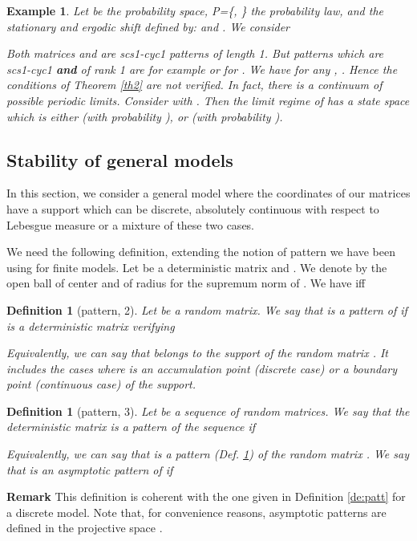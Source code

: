 \documentclass[11pt,titlepage]{article}
\newcommand{\parag}{\medskip\noindent}
\newtheorem{defi}[theo]{Definition }
\newtheorem{example}[theo]{Example }
\newenvironment{exam}{\begin{example}\rm}{\end{example}}
\begin{document}
\begin{exam}
\label{ex:erg1}
Let  be the probability space,
P=\{, \} the 
probability law, and  the stationary and ergodic shift defined by:
 and .
We consider


Both matrices  and  are scs1-cyc1 patterns of length 1. But
patterns which are scs1-cyc1 {\bf and} of rank 1 are for example  or  for
. We have for any , . Hence the conditions of Theorem \ref{th2}
are not verified. In fact, there is a continuum of
possible periodic limits. Consider  with
. Then the limit regime of  has a
state space which is either 
 (with probability ), or  (with probability ).
\end{exam}

\subsection{Stability of general models}
\label{sse:sgm}
In this section, we consider a general model where the coordinates of our
matrices have a support which can be discrete, 
absolutely continuous with respect to Lebesgue measure or a mixture of these
two cases.

\parag
We need the following definition, extending the notion of pattern we have
been using for finite models. 
Let  be a 
deterministic matrix and . We denote
by  the open ball of center  and of radius  for the supremum norm of . We have  iff


\begin{defi}[pattern, 2]
\label{de:pattern}
Let  be a random matrix. We say that  is a pattern of  if
 is a deterministic 
matrix verifying
 
Equivalently, we can say that  belongs to the support
of the random matrix . It includes the cases where 
 is an accumulation point (discrete case) or a boundary point
(continuous case) of the support.
\end{defi}

\begin{defi}[pattern, 3]
\label{de:pattern2}
Let  be a sequence of random matrices. We say that the
deterministic matrix
 is a pattern of the sequence  if 

Equivalently, we can say that
 is a pattern (Def. \ref{de:pattern}) of the random matrix
. We say that  is an
asymptotic pattern of  if 


\end{defi}
{\bf Remark } This definition is coherent with the one given in Definition
\ref{de:patt} for a discrete model. Note that, for convenience reasons, 
asymptotic patterns are defined in the projective space . 
\end{document}
